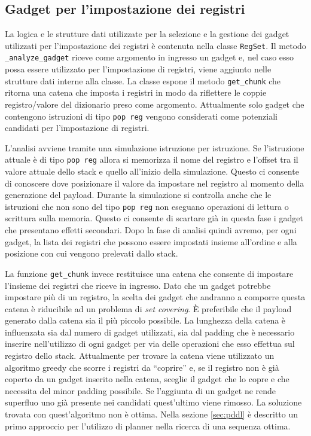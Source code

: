 \subsection{Gadget per l'impostazione dei registri}

La logica e le strutture dati utilizzate per la selezione e la
gestione dei gadget utilizzati per l'impostazione dei registri è
contenuta nella classe \lstinline{RegSet}. Il metodo
\lstinline{_analyze_gadget} riceve come argomento in ingresso un
gadget e, nel caso esso possa essere utilizzato per l'impostazione di
registri, viene aggiunto nelle strutture dati interne alla classe. La
classe espone il metodo \lstinline{get_chunk} che ritorna una catena
che imposta i registri in modo da riflettere le coppie registro/valore
del dizionario preso come argomento. Attualmente solo gadget che
contengono istruzioni di tipo \lstinline{pop reg} vengono considerati
come potenziali candidati per l'impostazione di registri.

L'analisi avviene tramite una simulazione istruzione per
istruzione. Se l'istruzione attuale è di tipo \lstinline{pop reg}
allora si memorizza il nome del registro e l'offset tra il valore
attuale dello stack e quello all'inizio della simulazione. Questo ci
consente di conoscere dove posizionare il valore da impostare nel
registro al momento della generazione del payload. Durante la
simulazione si controlla anche che le istruzioni che non sono del tipo
\lstinline{pop reg} non eseguano operazioni di lettura o scrittura
sulla memoria. Questo ci consente di scartare già in questa fase i
gadget che presentano effetti secondari. Dopo la fase di analisi
quindi avremo, per ogni gadget, la lista dei registri che possono
essere impostati insieme all'ordine e alla posizione con cui vengono
prelevati dallo stack. 


La funzione \lstinline{get_chunk} invece restituisce una catena che
consente di impostare l'insieme dei registri che riceve in
ingresso. Dato che un gadget potrebbe impostare più di un registro, la
scelta dei gadget che andranno a comporre questa catena è riducibile
ad un problema di \emph{set covering}. È preferibile che il payload
generato dalla catena sia il più piccolo possibile. La lunghezza della
catena è influenzata sia dal numero di gadget utilizzati, sia dal
padding che è necessario inserire nell'utilizzo di ogni gadget per via
delle operazioni che esso effettua sul registro dello
stack. Attualmente per trovare la catena viene utilizzato un algoritmo
greedy che scorre i registri da ``coprire'' e, se il registro non è
già coperto da un gadget inserito nella catena, sceglie il gadget che
lo copre e che necessita del minor padding possibile. Se l'aggiunta di
un gadget ne rende superfluo uno già presente nei candidati
quest'ultimo viene rimosso. La soluzione trovata con quest'algoritmo
non è ottima. Nella sezione \ref{sec:pddl} è descritto un primo
approccio per l'utilizzo di planner nella ricerca di una sequenza
ottima.

